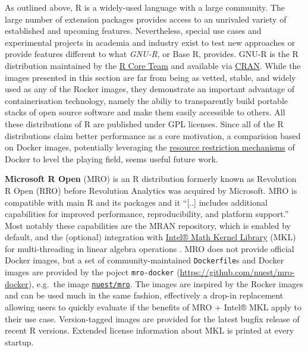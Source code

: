 As outlined above, R is a widely-used language with a large community.
The large number of extension packages provides access to an unrivaled
variety of established and upcoming features. Nevertheless, special use
cases and experimental projects in academia and industry exist to test
new approaches or provide features different to what \emph{GNU-R}, or
Base R, provides. GNU-R is the R distribution maintained by the
\href{https://www.r-project.org/contributors.html}{R Core Team} and
available via \href{https://cran.r-project.org/}{CRAN}. While the images
presented in this section are far from being as vetted, stable, and
widely used as any of the Rocker images, they demonstrate an important
advantage of containerisation technology, namely the abiliy to
transparently build portable stacks of open source software and make
them easily accessible to others. All these distributions of R are
published under GPL licenses. Since all of the R distributions claim
better performance as a core motivation, a comparision based on Docker
images, potentially leveraging the
\href{https://docs.docker.com/config/containers/resource_constraints/}{resource
restriction mechanisms} of Docker to level the playing field, seems
useful future work.

\textbf{Microsoft R Open} (MRO) is an R distribution formerly known as
Revolution R Open (RRO) before Revolution Analytics was acquired by
Microsoft. MRO is compatible with main R and its packages and it
``{[}..{]} includes additional capabilities for improved performance,
reproducibility, and platform support.'' \citep{microsoft_mro} Most
notably these capabilities are the MRAN repository, which is enabled by
default, and the (optional) integration with
\href{https://software.intel.com/en-us/mkl}{Intel® Math Kernel Library}
(MKL) for multi-threading in linear algebra operations
\citep{microsoft_multithread}. MRO does not provide official Docker
images, but a set of community-maintained \texttt{Dockerfile}s and
Docker images are provided by the poject \texttt{mro-docker}
(\url{https://github.com/nuest/mro-docker}), e.g.~the image
\href{https://hub.docker.com/repository/docker/nuest/mro/}{\texttt{nuest/mro}}.
The images are inspired by the Rocker images and can be used much in the
same fashion, effectively a drop-in replacement allowing users to
quickly evaluate if the benefits of MRO + Intel® MKL apply to their use
case. Version-tagged images are provided for the latest bugfix release
of recent R versions. Extended license information about MKL is printed
at every startup.

